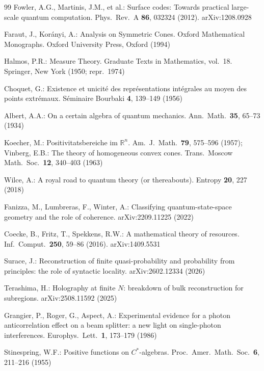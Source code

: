 \documentclass[11pt]{article}
\theoremstyle{remark}
\begin{document}
\begin{thebibliography}{99}
 Fowler, A.G., Martinis, J.M., et al.: Surface codes: Towards practical large-scale quantum computation. Phys.\ Rev.\ A \textbf{86}, 032324 (2012). arXiv:1208.0928

 Faraut, J., Korányi, A.: Analysis on Symmetric Cones. Oxford Mathematical Monographs. Oxford University Press, Oxford (1994)

 Halmos, P.R.: Measure Theory. Graduate Texts in Mathematics, vol.\ 18. Springer, New York (1950; repr.\ 1974)

 Choquet, G.: Existence et unicit\'{e} des repr\'{e}sentations int\'{e}grales au moyen des points extr\'{e}maux. S\'{e}minaire Bourbaki \textbf{4}, 139--149 (1956)

 Albert, A.A.: On a certain algebra of quantum mechanics. Ann.\ Math.\ \textbf{35}, 65--73 (1934)

 Koecher, M.: Positivitatsbereiche im $\mathbb{R}^n$. Am.\ J.\ Math.\ \textbf{79}, 575--596 (1957); Vinberg, E.B.: The theory of homogeneous convex cones. Trans.\ Moscow Math.\ Soc.\ \textbf{12}, 340--403 (1963)

 Wilce, A.: A royal road to quantum theory (or thereabouts). Entropy \textbf{20}, 227 (2018)

 Fanizza, M., Lumbreras, F., Winter, A.: Classifying quantum-state-space geometry and the role of coherence. arXiv:2209.11225 (2022)

 Coecke, B., Fritz, T., Spekkens, R.W.: A mathematical theory of resources. Inf.\ Comput.\ \textbf{250}, 59--86 (2016). arXiv:1409.5531

 Surace, J.: Reconstruction of finite quasi-probability and probability from principles: the role of syntactic locality. arXiv:2602.12334 (2026)

 Terashima, H.: Holography at finite $N$: breakdown of bulk reconstruction for subregions. arXiv:2508.11592 (2025)

 Grangier, P., Roger, G., Aspect, A.: Experimental evidence for a photon anticorrelation effect on a beam splitter: a new light on single-photon interferences. Europhys.\ Lett.\ \textbf{1}, 173--179 (1986)

 Stinespring, W.F.: Positive functions on $C^*$-algebras. Proc.\ Amer.\ Math.\ Soc.\ \textbf{6}, 211--216 (1955)


\end{thebibliography}
\end{document}
